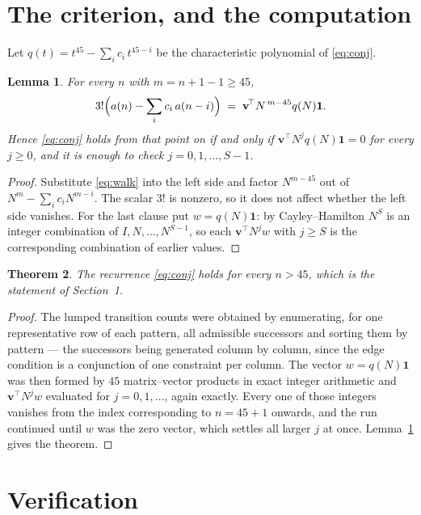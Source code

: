 \documentclass[11pt,a4paper]{article}
\theoremstyle{plain}
\newtheorem{theorem}{Theorem}
\newtheorem{lemma}[theorem]{Lemma}
\theoremstyle{definition}
\begin{document}
\section{The criterion, and the computation}

Let $q(t)=t^{45}-\sum_i c_i\,t^{45-i}$ be the characteristic polynomial of
\eqref{eq:conj}.

\begin{lemma}\label{lem:crit}
For every $n$ with $m=n+1-1\ge45$,
\[
3!\Bigl(a(n)-\sum_i c_i\,a(n-i)\Bigr)\;=\;\mathbf{v}^{\!\top}N^{\,m-45}q(N)\mathbf{1} .
\]
Hence \eqref{eq:conj} holds from that point on if and only if
$\mathbf{v}^{\!\top}N^{j}q(N)\mathbf{1}=0$ for every $j\ge0$, and it is enough to check
$j=0,1,\dots,S-1$.
\end{lemma}

\begin{proof}
Substitute \eqref{eq:walk} into the left side and factor $N^{m-45}$ out of
$N^{m}-\sum_i c_iN^{m-i}$. The scalar $3!$ is nonzero, so it does not affect whether
the left side vanishes. For the last clause put $w=q(N)\mathbf{1}$: by Cayley--Hamilton
$N^{S}$ is an integer combination of $I,N,\dots,N^{S-1}$, so each
$\mathbf{v}^{\!\top}N^{j}w$ with $j\ge S$ is the corresponding combination of earlier
values.
\end{proof}

\begin{theorem}
The recurrence \eqref{eq:conj} holds for every $n>45$, which is the statement of
Section~1.
\end{theorem}

\begin{proof}
The lumped transition counts were obtained by enumerating, for one representative row of
each pattern, all admissible successors and sorting them by pattern --- the successors being
generated column by column, since the edge condition is a conjunction of one constraint per
column. The vector $w=q(N)\mathbf{1}$ was then formed by $45$ matrix--vector products
in exact integer arithmetic and $\mathbf{v}^{\!\top}N^{j}w$ evaluated for
$j=0,1,\dots$, again exactly. Every one of those integers vanishes from the index
corresponding to $n=45+1$ onwards, and the run continued until $w$ was the zero vector,
which settles all larger $j$ at once. Lemma~\ref{lem:crit} gives the theorem.
\end{proof}

\section{Verification}
\end{document}
